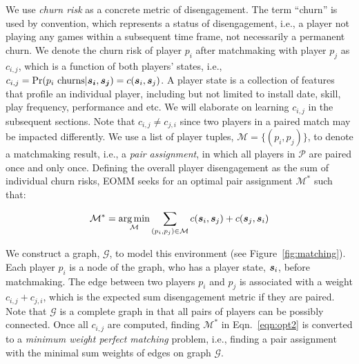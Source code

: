 We use \emph{churn risk} as a concrete metric of disengagement. The term ``churn'' is used by convention, which represents a status of disengagement, i.e., a player not playing any games within a subsequent time frame, not necessarily a permanent churn. We denote the churn risk of player $p_i$ after matchmaking with player $p_j$ as $c_{i,j}$, which is a function of both players' states, i.e., $c_{i,j}=\Pr(p_i \text{ churns} | \boldsymbol{s_i}, \boldsymbol{s_j})=c(\boldsymbol{s}_i, \boldsymbol{s}_j)$. A player state is a collection of features that profile an individual player, including but not limited to install date, skill, play frequency, performance and etc. We will elaborate on learning $c_{i,j}$ in the subsequent sections. Note that $c_{i,j}\neq c_{j,i}$ since two players in a paired match may be impacted differently. We use a list of player tuples, $\mathcal{M}=\{(p_i,p_j)\}$, to denote a matchmaking result, i.e., a \textit{pair assignment}, in which all players in $\mathcal{P}$ are paired once and only once. Defining the overall player disengagement as the sum of individual churn risks, EOMM seeks for an optimal pair assignment $\mathcal{M}^*$ such that:

\begin{align}
\mathcal{M}^* = \operatorname*{arg\,min}_{\mathcal{M}} \sum\limits_{(p_i, p_j)\in \mathcal{M}} c(\boldsymbol{s}_i, \boldsymbol{s}_j) + c(\boldsymbol{s}_j, \boldsymbol{s}_i) \label{eqn:opt2}
\end{align}


We construct a graph, $\mathcal{G}$, to model this environment (see Figure~\ref{fig:matching}). Each player $p_i$ is a node of the graph, who has a player state, $\boldsymbol{s}_i$, before matchmaking. The edge between two players $p_i$ and $p_j$ is associated with a weight $c_{i,j} + c_{j,i}$, which is the expected sum disengagement metric if they are paired. Note that $\mathcal{G}$ is a complete graph in that all pairs of players can be possibly connected. Once all $c_{i,j}$ are computed, finding $\mathcal{M}^*$ in Eqn.~\ref{eqn:opt2} is converted to a \emph{minimum weight perfect matching} problem, i.e., finding a pair assignment with the minimal sum weights of edges on graph $\mathcal{G}$.

